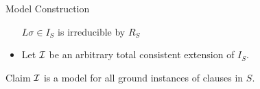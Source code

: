 \documentclass[%
handout,
]{beamer}
\begin{document}
\begin{frame}[allowframebreaks]{Model Construction}
\begin{itemize}
            \hfill
            $L\sigma\in I_S$ is irreducible by $R_S$

            \vspace{0.7em}
            \item Let $\mathcal{I}$ be an arbitrary total consistent extension of $I_S$.
        \end{itemize}

        \vspace{1.4em}

        \begin{block}{Claim}
            $\mathcal{I}$ is a model for all ground instances of clauses in $S$.
        \end{block}
\end{frame}
\end{document}
